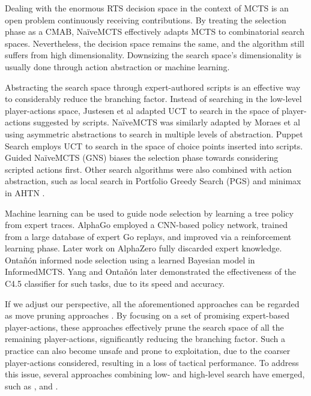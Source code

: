 \documentclass[conference]{IEEEtran}
\begin{document}
Dealing with the enormous RTS decision space in the context of MCTS is an open problem continuously receiving contributions. By treating the selection phase as a CMAB, NaïveMCTS effectively adapts MCTS to combinatorial search spaces. Nevertheless, the decision space remains the same, and the algorithm still suffers from high dimensionality. Downsizing the search space's dimensionality is usually done through action abstraction or machine learning.

Abstracting the search space through expert-authored scripts is an effective way to considerably reduce the branching factor. Instead of searching in the low-level player-actions space, Justesen et al \cite{justesen_script-_2014} adapted UCT to search in the space of player-actions suggested by scripts. NaïveMCTS was similarly adapted by Moraes et al \cite{moraes_action_2018} using asymmetric abstractions \cite{moraes_asymmetric_2018} to search in multiple levels of abstraction. Puppet Search \cite{barriga_puppet_2015} employs UCT to search in the space of choice points inserted into scripts. Guided NaïveMCTS (GNS) \cite{yang_guiding_2019} biases the selection phase towards considering scripted actions first. Other search algorithms were also combined with action abstraction, such as local search in Portfolio Greedy Search (PGS) \cite{churchill_portfolio_2013} and minimax in AHTN \cite{ontanon_adversarial_2015}.

Machine learning can be used to guide node selection by learning a tree policy from expert traces. AlphaGo \cite{silver_mastering_2016} employed a CNN-based policy network, trained from a large database of expert Go replays, and improved via a reinforcement learning phase. Later work on AlphaZero fully discarded expert knowledge. Ontañón informed node selection using a learned Bayesian model in InformedMCTS. Yang and Ontañón \cite{yang_extracting_2019} later demonstrated the effectiveness of the C4.5 classifier for such tasks, due to its speed and accuracy.


If we adjust our perspective, all the aforementioned approaches can be regarded as move pruning approaches \cite{yang_integrating_2020}. By focusing on a set of promising expert-based player-actions, these approaches effectively prune the search space of all the remaining player-actions, significantly reducing the branching factor. Such a practice can also become unsafe and prone to exploitation, due to the coarser player-actions considered, resulting in a loss of tactical performance. To address this issue, several approaches combining low- and high-level search have emerged, such as \cite{barriga_combining_2017}, \cite{neufeld_hybrid_2019} and \cite{moraes_action_2018}.
\end{document}
